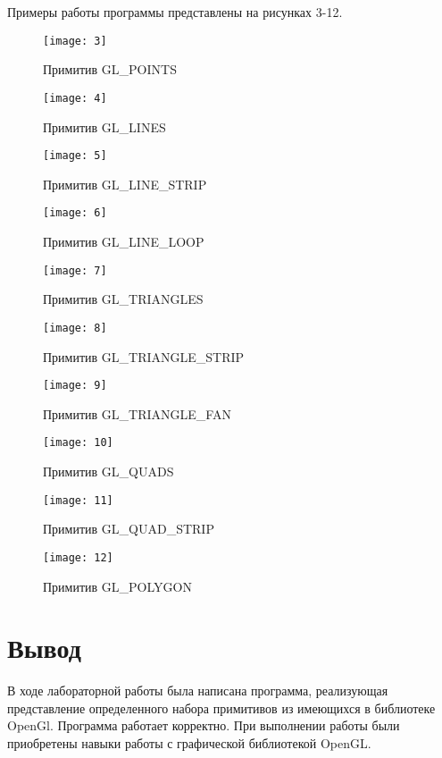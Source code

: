 Примеры работы программы представлены на рисунках 3-12.
\begin{figure}[H]
    \centering
    \texttt{[image: 3]}
    \caption{Примитив GL\_POINTS}
    \label{fig:3}
\end{figure}
\begin{figure}[H]
    \centering
    \texttt{[image: 4]}
    \caption{Примитив GL\_LINES}
    \label{fig:4}
\end{figure}
\begin{figure}[H]
    \centering
    \texttt{[image: 5]}
    \caption{Примитив GL\_LINE\_STRIP}
    \label{fig:5}
\end{figure}
\begin{figure}[H]
    \centering
    \texttt{[image: 6]}
    \caption{Примитив GL\_LINE\_LOOP}
    \label{fig:6}
\end{figure}
\begin{figure}[H]
    \centering
    \texttt{[image: 7]}
    \caption{Примитив GL\_TRIANGLES}
    \label{fig:7}
\end{figure}
\begin{figure}[H]
    \centering
    \texttt{[image: 8]}
    \caption{Примитив GL\_TRIANGLE\_STRIP}
    \label{fig:8}
\end{figure}
\begin{figure}[H]
    \centering
    \texttt{[image: 9]}
    \caption{Примитив GL\_TRIANGLE\_FAN}
    \label{fig:9}
\end{figure}
\begin{figure}[H]
    \centering
    \texttt{[image: 10]}
    \caption{Примитив GL\_QUADS}
    \label{fig:10}
\end{figure}
\begin{figure}[H]
    \centering
    \texttt{[image: 11]}
    \caption{Примитив GL\_QUAD\_STRIP}
    \label{fig:11}
\end{figure}
\begin{figure}[H]
    \centering
    \texttt{[image: 12]}
    \caption{Примитив GL\_POLYGON}
    \label{fig:12}
\end{figure}
\section*{Вывод}
В ходе лабораторной работы была написана программа, реализующая представление определенного набора примитивов из имеющихся в библиотеке OpenGl.
Программа работает корректно.
При выполнении работы были приобретены навыки работы с графической библиотекой OpenGL.